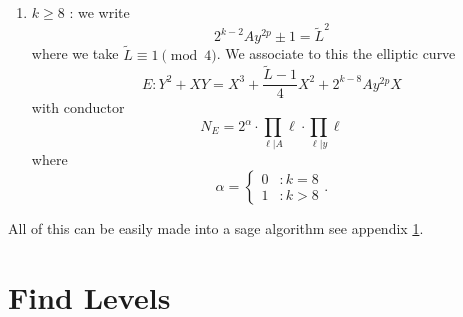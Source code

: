 \documentclass[12pt]{article}
\begin{document}
\begin{enumerate}
\begin{enumerate}
\item $k \geq 8$ : we write
\[ 2^{k-2} A y^{2p} \pm 1  = \tilde{L}^2 \]
where we take $\tilde{L} \equiv 1 \pmod{4}$.  We associate to this the elliptic curve
\[ E: Y^2 + XY = X^3 + \frac{\tilde{L} -1}{4}X^2 + 2^{k-8}Ay^{2p}X \]
with conductor
\[ N_E = 2^\alpha \cdot \prod_{\ell | A} \ell \cdot \prod_{\ell | y} \ell \]
where 
\[ \alpha = \begin{cases} 0 & : k = 8 \\ 1 & : k > 8 \end{cases} .\]



\end{enumerate}

All of this can be easily made into a sage algorithm see appendix \ref{findlevels}.



\end{enumerate}

\appendix


\section{Find Levels}\label{findlevels}
\end{document}
